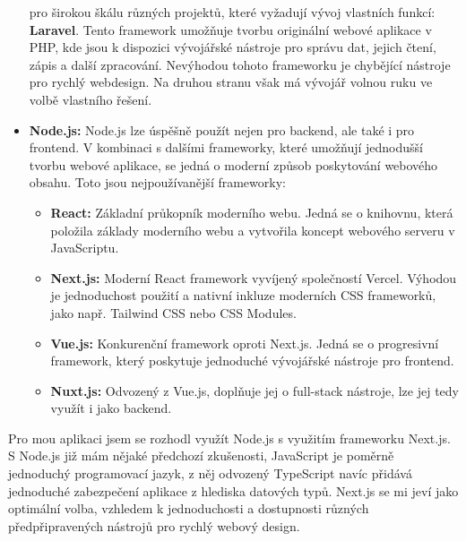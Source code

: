 \begin{itemize}
        pro širokou škálu různých projektů, které vyžadují vývoj vlastních
        funkcí: \textbf{Laravel}. Tento framework umožňuje tvorbu originální
        webové aplikace v PHP, kde jsou k dispozici vývojářské nástroje
        pro správu dat, jejich čtení, zápis a další zpracování. Nevýhodou
        tohoto frameworku je chybějící nástroje pro rychlý webdesign.
        Na druhou stranu však má vývojář volnou ruku ve volbě vlastního
        řešení.
    \item \textbf{Node.js:} Node.js lze úspěšně použít nejen pro backend,
        ale také i pro frontend. V kombinaci s dalšími frameworky, které
        umožňují jednodušší tvorbu webové aplikace, se jedná o moderní
        způsob poskytování webového obsahu. Toto jsou nejpoužívanější
        frameworky:
        \begin{itemize}
            \item \textbf{React:} Základní průkopník moderního webu.
                Jedná se o knihovnu, která položila základy moderního
                webu a vytvořila koncept webového serveru v JavaScriptu.
            \item \textbf{Next.js:} Moderní React framework vyvíjený
                společností Vercel. Výhodou je jednoduchost použití
                a nativní inkluze moderních CSS frameworků, jako např.
                Tailwind CSS nebo CSS Modules.
            \item \textbf{Vue.js:} Konkurenční framework oproti Next.js.
                Jedná se o progresivní framework, který poskytuje jednoduché
                vývojářské nástroje pro frontend.
            \item \textbf{Nuxt.js:} Odvozený z Vue.js, doplňuje jej
                o full-stack nástroje, lze jej tedy využít i jako backend.
        \end{itemize}
\end{itemize}

Pro mou aplikaci jsem se rozhodl využít Node.js s využitím frameworku Next.js.
S Node.js již mám nějaké předchozí zkušenosti, JavaScript je poměrně
jednoduchý programovací jazyk, z něj odvozený TypeScript navíc přidává
jednoduché zabezpečení aplikace z hlediska datových typů. Next.js se mi jeví
jako optimální volba, vzhledem k jednoduchosti a dostupnosti různých
předpřipravených nástrojů pro rychlý webový design.

\endinput

